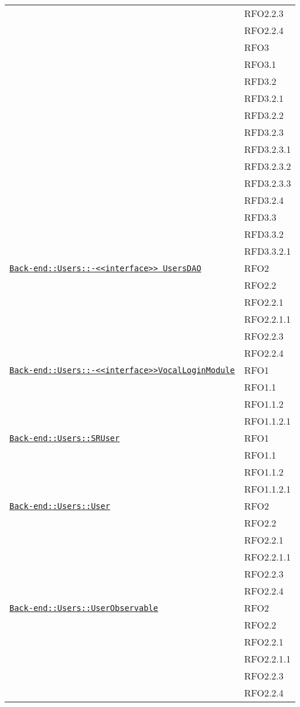 \begin{longtable}{|>{\centering}m{10cm}|m{3cm}<{\centering}|}
& RFO2.2.3\\
& RFO2.2.4\\
& RFO3\\
& RFO3.1\\
& RFD3.2\\
& RFD3.2.1\\
& RFD3.2.2\\
& RFD3.2.3\\
& RFD3.2.3.1\\
& RFD3.2.3.2\\
& RFD3.2.3.3\\
& RFD3.2.4\\
& RFD3.3\\
& RFD3.3.2\\
& RFD3.3.2.1\\ \hline

\hyperref[Back-end::Users::<<interface>> UsersDAO]{\texttt{Back-end::Users::-\linebreak <<interface>> UsersDAO}} & RFO2\\
& RFO2.2\\
& RFO2.2.1\\
& RFO2.2.1.1\\
& RFO2.2.3\\
& RFO2.2.4\\ \hline

\hyperref[Back-end::Users::<<interface>>VocalLoginModule]{\texttt{Back-end::Users::-\linebreak <<interface>>VocalLoginModule}} & RFO1\\
& RFO1.1\\
& RFO1.1.2\\
& RFO1.1.2.1\\ \hline

\hyperref[Back-end::Users::SRUser]{\texttt{Back-end::Users::SRUser}} & RFO1\\
& RFO1.1\\
& RFO1.1.2\\
& RFO1.1.2.1\\ \hline

\hyperref[Back-end::Users::User]{\texttt{Back-end::Users::User}} & RFO2\\
& RFO2.2\\
& RFO2.2.1\\
& RFO2.2.1.1\\
& RFO2.2.3\\
& RFO2.2.4\\ \hline

\hyperref[Back-end::Users::UserObservable]{\texttt{Back-end::Users::UserObservable}} & RFO2\\
& RFO2.2\\
& RFO2.2.1\\
& RFO2.2.1.1\\
& RFO2.2.3\\
& RFO2.2.4\\ \hline


\end{longtable}
